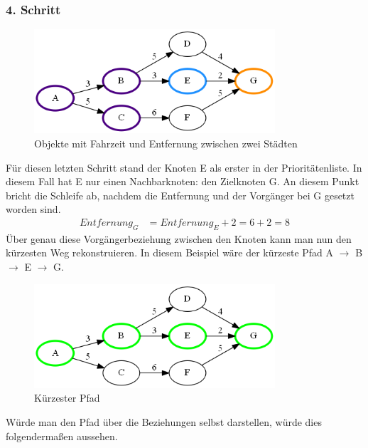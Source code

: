 \documentclass[11pt]{scrreprt}
\begin{document}
			\subsubsection{4. Schritt}
			\begin{figure}[ht]
				\centering
				\includegraphics[width=0.8\textwidth]{Graphs/Example4}
				\caption{Objekte mit Fahrzeit und Entfernung zwischen zwei Städten}
			\end{figure}
			\FloatBarrier
			Für diesen letzten Schritt stand der Knoten E als erster in der Prioritätenliste. In diesem Fall hat E nur einen Nachbarknoten: den Zielknoten G.
			An diesem Punkt bricht die Schleife ab, nachdem die Entfernung und der Vorgänger bei G gesetzt worden sind.
			\begin{align*}
			Entfernung_G &= Entfernung_E + 2 = 6 + 2 = 8
			\end{align*}
			Über genau diese Vorgängerbeziehung zwischen den Knoten kann man nun den kürzesten Weg rekonstruieren.
			In diesem Beispiel wäre der kürzeste Pfad A $\rightarrow$ B $\rightarrow$ E $\rightarrow$ G.
		
			\begin{figure}[ht]
				\centering
				\includegraphics[width=0.8\textwidth]{Graphs/ExamplePathFull}
				\caption{Kürzester Pfad}
			\end{figure}
			\FloatBarrier
			
			\newpage
			Würde man den Pfad über die Beziehungen selbst darstellen, würde dies folgendermaßen aussehen.
			
\end{document}
